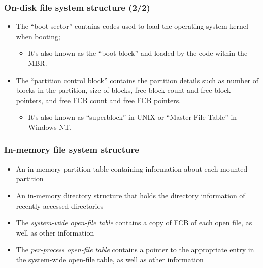\documentclass[CJKutf8,xcolor=pdftex,dvipsnames,table]{beamer}
\begin{document}
\begin{CJK*}{UTF8}{song}
  \begin{frame}
    \frametitle{On-disk file system structure (2/2)} \pause
    \begin{itemize}\parskip=0pt
    \item The ``boot sector'' contains codes used to load the operating system kernel when booting; \pause
      \begin{itemize}\parskip=0pt
      \item It's also known as the ``boot block'' and loaded by the code within the MBR. \pause
      \end{itemize}
    \item The ``partition control block'' contains the partition details such as number of blocks in the partition, size of blocks, free-block count and free-block pointers, and free FCB count and free FCB pointers. \pause
      \begin{itemize}\parskip=0pt
      \item It's also known as ``superblock'' in UNIX or ``Master File Table'' in Windows NT.
      \end{itemize}
    \end{itemize}
  \end{frame}
  
  \begin{frame}
    \frametitle{In-memory file system structure} \pause
    \begin{itemize}\parskip=0pt
    \item An in-memory partition table containing information about each mounted partition \pause
    \item An in-memory directory structure that holds the directory information of recently accessed directories \pause
    \item The \emph{system-wide open-file table} contains a copy of FCB of each open file, as well as other information \pause
    \item The \emph{per-process open-file table} contains a pointer to the appropriate entry in the system-wide open-file table, as well as other information
    \end{itemize}
  \end{frame}
  

\end{CJK*}
\end{document}
